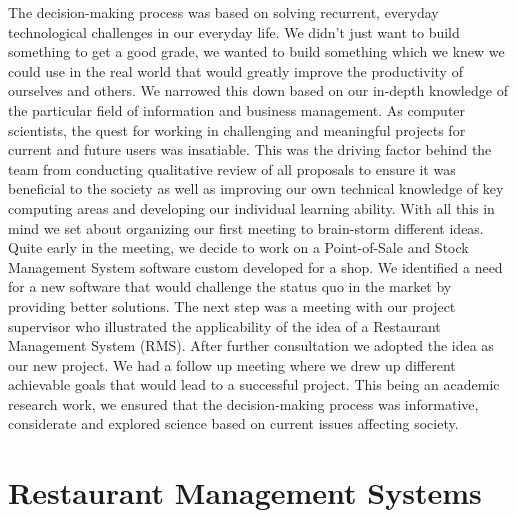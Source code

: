 The decision-making process was based on solving recurrent, everyday technological challenges in our everyday life. We didn't just want to build something to get a good grade, we wanted to build something which we knew we could use in the real world that would greatly improve the productivity of ourselves and others. We narrowed this down based on our in-depth knowledge of the particular field of information and business management. As computer scientists, the quest for working in challenging and meaningful projects for current and future users was insatiable. This was the driving factor behind the team from conducting qualitative review of all proposals to ensure it was beneficial to the society as well as improving our own technical knowledge of key computing areas and developing our individual learning ability. With all this in mind we set about organizing our first meeting to brain-storm different ideas. 
\newline
\newline
Quite early in the meeting, we decide to work on a Point-of-Sale and Stock Management System software custom developed for a shop. We identified a need for a new software that would challenge the status quo in the market by providing better solutions. The next step was a meeting with our project supervisor who illustrated the applicability of the idea of a Restaurant Management System (RMS). After further consultation we adopted the idea as our new project. We had a follow up meeting where we drew up different achievable goals that would lead to a successful project. This being an academic research work, we ensured that the decision-making process was informative, considerate and explored science based on current issues affecting society. 

\section{Restaurant Management Systems} 

